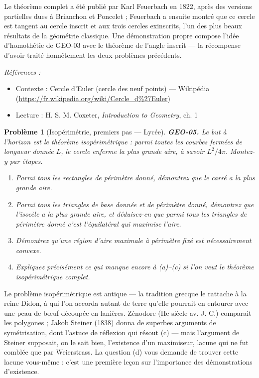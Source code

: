 \documentclass[11pt]{article}
\newtheorem{problem}{Problème}
\newenvironment{refs}{\par\small\noindent\emph{Références :}\begin{itemize}\setlength\itemsep{0pt}}{\end{itemize}\normalsize}
\begin{document}
\noindent Le théorème complet a été publié par Karl Feuerbach en 1822, après des
versions partielles dues à Brianchon et Poncelet ; Feuerbach a ensuite montré que ce cercle
est tangent au cercle inscrit et aux trois cercles exinscrits, l'un des plus beaux résultats
de la géométrie classique. Une démonstration propre compose l'idée d'homothétie de GEO-03 avec
le théorème de l'angle inscrit --- la récompense d'avoir traité honnêtement les deux problèmes
précédents.

\begin{refs}
\item Contexte : Cercle d'Euler (cercle des neuf points) --- Wikipédia (\url{https://fr.wikipedia.org/wiki/Cercle_d%27Euler})
\item Lecture : H. S. M. Coxeter, \textit{Introduction to Geometry}, ch. 1
\end{refs}

\bigskip

\begin{problem}[{Isopérimétrie, premiers pas --- Lycée}]
\textbf{GEO-05.} Le but à l'horizon est le théorème isopérimétrique : parmi toutes les
courbes fermées de longueur donnée $ L $, le cercle enferme la plus grande aire, à savoir
$ L^2/4\pi $. Montez-y par étapes.
\begin{enumerate}
\item[(a)] Parmi tous les rectangles de périmètre donné, démontrez que le carré a la plus grande
aire.
\item[(b)] Parmi tous les triangles de base donnée et de périmètre donné, démontrez que l'isocèle a
la plus grande aire, et déduisez-en que parmi tous les triangles de périmètre donné c'est
l'équilatéral qui maximise l'aire.
\item[(c)] Démontrez qu'une région d'aire maximale à périmètre fixé est nécessairement convexe.
\item[(d)] Expliquez précisément ce qui manque encore à (a)--(c) si l'on veut le théorème
isopérimétrique complet.
\end{enumerate}

\end{problem}

\noindent Le problème isopérimétrique est antique --- la tradition grecque le rattache
à la reine Didon, à qui l'on accorda autant de terre qu'elle pourrait en entourer avec une
peau de b\oe{}uf découpée en lanières. Zénodore (IIe siècle av. J.-C.) comparait les
polygones ; Jakob Steiner (1838) donna de superbes arguments de symétrisation, dont l'astuce
de réflexion qui résout (c) --- mais l'argument de Steiner supposait, on le sait bien, l'existence
d'un maximiseur, lacune qui ne fut comblée que par Weierstrass. La question (d) vous demande de
trouver cette lacune vous-même : c'est une première leçon sur l'importance des démonstrations
d'existence.
\end{document}
